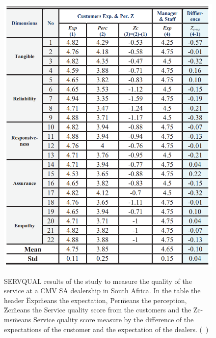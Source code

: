 \begin{figure}[h]
  \caption{SERVQUAL results of the study to measure the quality of the service at a CMV SA dealership in South Africa. In the table the header \"Exp\" means the expectation, \"Per\" means the perception, \"Zc\" means the Service quality score from the customers and the \"Zc-ms\" means Service quality score measure by the difference of the expectations of the customer and the expectation of the dealers. (~\cite{Measuring_After_sales_Service_Quality})}
  \centering
  \includegraphics[width=\textwidth]{figs/SERVQUAL_results}
  \label{fig:SERVQUAL_results}
\end{figure}

